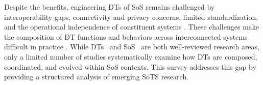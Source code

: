 Despite the benefits, engineering DTs of SoS remains challenged by interoperability gaps, connectivity and privacy concerns, limited standardization, and the operational independence of constituent systems \cite{michael2022integration,dietz2020digital,borth2019digital}. These challenges make the composition of DT functions and behaviors across interconnected systems difficult in practice \cite{gill2024toward}.
While DTs~\cite{barricelli2019survey,kritzinger2018digital,tao2018digital,fuller2020digital,negri2017review,ferko2022architecting,ferko2023standardisation} and SoS~\cite{gorod2008system,nielsen2015systems,klein2013systematic,axelsson2015systematic,dridi2020system,santos2022evaluation,vargas2016approaches} are both well-reviewed research areas, only a limited number of studies systematically examine how DTs are composed, coordinated, and evolved within SoS contexts. This survey addresses this gap by providing a structured analysis of emerging SoTS research.








